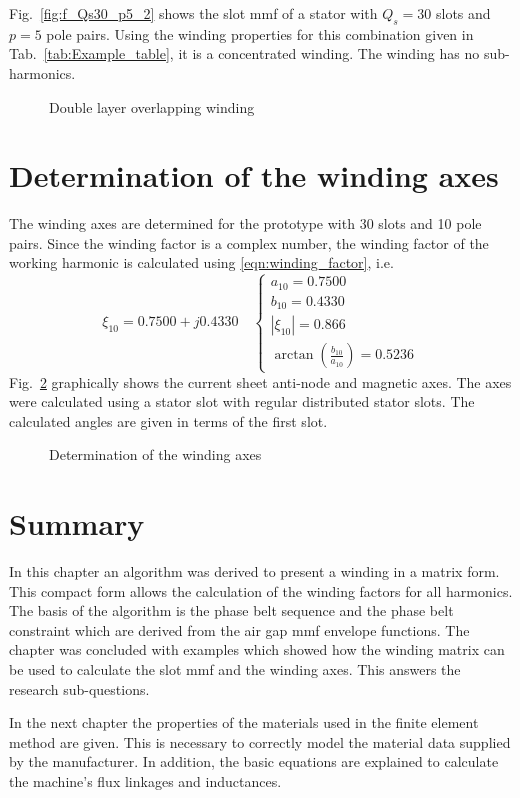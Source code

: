Fig.~\ref{fig:f_Qs30_p5_2} shows the slot mmf of a stator with $Q_s=30$ slots and $p=5$ pole pairs. Using the winding properties for this combination given in Tab.~\ref{tab:Example_table}, it is a concentrated winding. The winding has no sub-harmonics. 
\begin{figure}[htbp]
	\centering
	
	\vspace{1cm}
	
	\caption{Double layer overlapping winding}
	\label{Main_double_overlapping}
\end{figure}

\section{Determination of the winding axes}\label{sec:axes}
The winding axes are determined for the prototype with 30 slots and 10 pole pairs. Since the winding factor is a complex number, the winding factor of the working harmonic is calculated using \eqref{eqn:winding_factor}, i.e. 
\begin{equation}
  \xi_{10} = 0.7500 + j0.4330
  \quad
  \begin{cases}
  a_{10} = 0.7500\\
  b_{10} = 0.4330\\
  \left|\xi_{10}\right|=0.866\\
  \arctan\left(\frac{b_{10}}{a_{10}}\right)=0.5236
  \end{cases}
\end{equation}
Fig.~\ref{fig:determ_axis} graphically shows the current sheet anti-node and magnetic axes. The axes were calculated using a stator slot with regular distributed stator slots. The calculated angles are given in terms of the first slot. 
\begin{figure}
	\centering
		
	\caption{Determination of the winding axes}
	\label{fig:determ_axis}
\end{figure}

\section{Summary}
In this chapter an algorithm was derived to present a winding in a matrix form. This compact form allows the calculation of the winding factors for all harmonics. The basis of the algorithm is the phase belt sequence and the phase belt constraint which are derived from the air gap mmf envelope functions. The chapter was concluded with  examples which showed how the winding matrix can be used to calculate the slot mmf and the winding axes. This answers the research sub-questions.

In the next chapter the properties of the materials used in the finite element method are given. This is necessary to correctly model the material data supplied by the manufacturer. In addition, the basic equations are explained to calculate the machine's flux linkages and inductances.    

\endinput